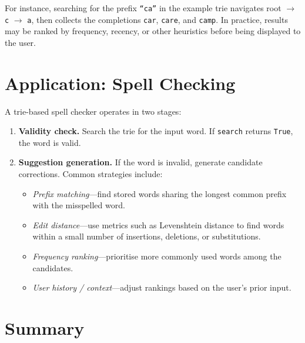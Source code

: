 \documentclass[11pt, a4paper, notitlepage]{report}
\theoremstyle{definition}
\theoremstyle{remark}
\theoremstyle{definition}
\begin{document}
For instance, searching for the prefix \texttt{``ca''} in the example trie
navigates root $\to$ \texttt{c} $\to$ \texttt{a}, then collects the
completions \texttt{car}, \texttt{care}, and \texttt{camp}.  In practice,
results may be ranked by frequency, recency, or other heuristics before
being displayed to the user.

\section{Application: Spell Checking}
\label{sec:trie-spellcheck}

A trie-based spell checker operates in two stages:

\begin{enumerate}
  \item \textbf{Validity check.}  Search the trie for the input word.  If
        \texttt{search} returns \texttt{True}, the word is valid.
  \item \textbf{Suggestion generation.}  If the word is invalid, generate
        candidate corrections.  Common strategies include:
        \begin{itemize}
          \item \emph{Prefix matching}---find stored words sharing the longest
                common prefix with the misspelled word.
          \item \emph{Edit distance}---use metrics such as Levenshtein distance
                to find words within a small number of insertions, deletions,
                or substitutions.
          \item \emph{Frequency ranking}---prioritise more commonly used words
                among the candidates.
          \item \emph{User history / context}---adjust rankings based on the
                user's prior input.
        \end{itemize}
\end{enumerate}

\section{Summary}
\label{sec:trie-summary}
\end{document}
